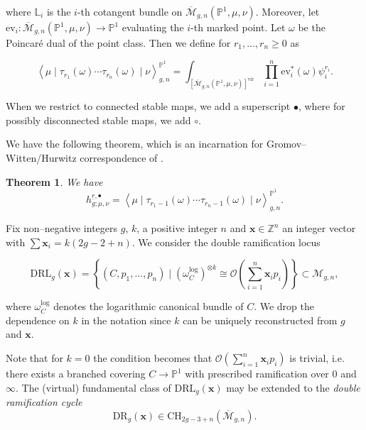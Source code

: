 \documentclass[10pt,a4paper,oneside,no-math,reqno]{amsart}%
\theoremstyle{plain}
\newtheorem{theorem}{Theorem}[section]
\theoremstyle{definition}
\theoremstyle{remark}
\numberwithin{equation}{section}
\newcommand{\1}{\mathds{1}}
\newcommand{\<}{\langle}
\renewcommand{\>}{\rangle}
\begin{document}
where $\mathbb{L}_i$ is the $i$-th cotangent bundle on $\overline{\mathcal{M}}_{g,n}(\mathbb{P}^1,\mu,\nu)$. Moreover, let $\mathrm{ev}_i\colon\overline{\mathcal{M}}_{g,n}(\mathbb{P}^1,\mu,\nu)\to\mathbb{P}^1$ evaluating the $i$-th marked point. Let $\omega$ be the Poincaré dual of the point class. Then we define for $r_1,\dots,r_n\ge0$ as

\begin{equation}\label{GWdef}
    \left\langle \mu \mid \tau_{r_1}(\omega) \cdots \tau_{r_n}(\omega) \mid \nu \right\rangle_{g,n}^{\mathbb{P}^1}
    =
    \int_{[\overline{\mathcal{M}}_{g,n}(\mathbb{P}^1,\mu,\nu)]^{\textrm{vir}}}\prod_{i=1}^n\mathrm{ev}_i^\ast(\omega)\psi_i^{r_i}.
\end{equation}

When we restrict to connected stable maps, we add a superscript $\bullet$, where for possibly disconnected stable maps, we add $\circ$.

We have the following theorem, which is an incarnation for Gromov--Witten/Hurwitz correspondence of \cite{OP06a}.

\begin{theorem}\label{GW/H}
    We have
    \begin{equation}
        h^{\underline{r},\bullet}_{g;\mu,\nu}
        =
        \left\langle\mu\mid \tau_{r_1-1}(\omega)\cdots\tau_{r_n-1}(\omega)\mid\nu\right\rangle_{g,n}^{\mathbb{P}^1}.
    \end{equation}
\end{theorem}



Fix non--negative integers $g$, $k$, a positive integer $n$ and $\mathbf{x}\in\mathbb{Z}^n$ an integer vector with $\sum \mathbf{x}_i=k(2g-2+n)$. We consider the double ramification locus

\begin{equation}
    \mathrm{DRL}_g(\mathbf{x})=\left\{(C,p_1,\dots,p_n)\mid (\omega_C^{\mathrm{log}})^{\otimes k}\cong\mathcal{O}\left(\sum_{i=1}^n\mathbf{x}_ip_i\right)\right\}\subset {\mathcal{M}}_{g,n},
\end{equation}

where $\omega_C^{\textrm{log}}$ denotes the logarithmic canonical bundle of $C$. We drop the dependence on $k$ in the notation since $k$ can be uniquely reconstructed from $g$ and $\mathbf{x}$.

Note that for $k=0$ the condition becomes that $\mathcal{O}\left(\sum_{i=1}^n\mathbf{x}_ip_i\right)$ is trivial, i.e. there exists a branched covering $C\to\mathbb{P}^1$ with prescribed ramification over $0$ and $\infty$. The (virtual) fundamental class of $\mathrm{DRL}_g(\mathbf{x})$ may be extended to the \textit{double ramification cycle}
\begin{equation}
    \mathrm{DR}_g(\mathbf{x})\in\mathrm{CH}_{2g-3+n}(\overline{\mathcal{M}}_{g,n}).
\end{equation}
\end{document}
